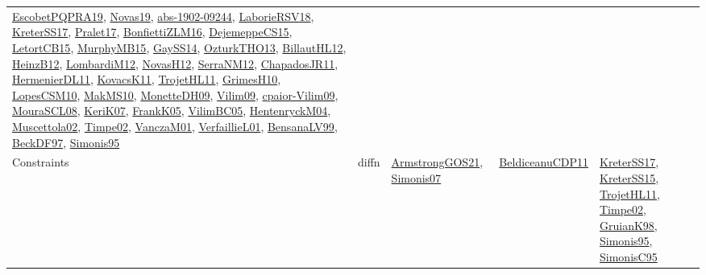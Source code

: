 {\begin{longtable}{lp{3cm}>{\raggedright}p{6cm}>{\raggedright}p{6cm}p{8cm}}
\href{articles/EscobetPQPRA19.pdf}{EscobetPQPRA19}\cite{EscobetPQPRA19}, \href{articles/Novas19.pdf}{Novas19}\cite{Novas19}, \href{articles/abs-1902-09244.pdf}{abs-1902-09244}\cite{abs-1902-09244}, \href{articles/LaborieRSV18.pdf}{LaborieRSV18}\cite{LaborieRSV18}, \href{articles/KreterSS17.pdf}{KreterSS17}\cite{KreterSS17}, \href{papers/Pralet17.pdf}{Pralet17}\cite{Pralet17}, \href{papers/BonfiettiZLM16.pdf}{BonfiettiZLM16}\cite{BonfiettiZLM16}, \href{papers/DejemeppeCS15.pdf}{DejemeppeCS15}\cite{DejemeppeCS15}, \href{articles/LetortCB15.pdf}{LetortCB15}\cite{LetortCB15}, \href{papers/MurphyMB15.pdf}{MurphyMB15}\cite{MurphyMB15}, \href{papers/GaySS14.pdf}{GaySS14}\cite{GaySS14}, \href{articles/OzturkTHO13.pdf}{OzturkTHO13}\cite{OzturkTHO13}, \href{papers/BillautHL12.pdf}{BillautHL12}\cite{BillautHL12}, \href{papers/HeinzB12.pdf}{HeinzB12}\cite{HeinzB12}, \href{articles/LombardiM12.pdf}{LombardiM12}\cite{LombardiM12}, \href{articles/NovasH12.pdf}{NovasH12}\cite{NovasH12}, \href{papers/SerraNM12.pdf}{SerraNM12}\cite{SerraNM12}, \href{papers/ChapadosJR11.pdf}{ChapadosJR11}\cite{ChapadosJR11}, \href{papers/HermenierDL11.pdf}{HermenierDL11}\cite{HermenierDL11}, \href{articles/KovacsK11.pdf}{KovacsK11}\cite{KovacsK11}, \href{articles/TrojetHL11.pdf}{TrojetHL11}\cite{TrojetHL11}, \href{papers/GrimesH10.pdf}{GrimesH10}\cite{GrimesH10}, \href{articles/LopesCSM10.pdf}{LopesCSM10}\cite{LopesCSM10}, \href{papers/MakMS10.pdf}{MakMS10}\cite{MakMS10}, \href{papers/MonetteDH09.pdf}{MonetteDH09}\cite{MonetteDH09}, \href{papers/Vilim09.pdf}{Vilim09}\cite{Vilim09}, \href{papers/cpaior-Vilim09.pdf}{cpaior-Vilim09}\cite{cpaior-Vilim09}, \href{papers/MouraSCL08.pdf}{MouraSCL08}\cite{MouraSCL08}, \href{papers/KeriK07.pdf}{KeriK07}\cite{KeriK07}, \href{papers/FrankK05.pdf}{FrankK05}\cite{FrankK05}, \href{articles/VilimBC05.pdf}{VilimBC05}\cite{VilimBC05}, \href{papers/HentenryckM04.pdf}{HentenryckM04}\cite{HentenryckM04}, \href{papers/Muscettola02.pdf}{Muscettola02}\cite{Muscettola02}, \href{articles/Timpe02.pdf}{Timpe02}\cite{Timpe02}, \href{papers/VanczaM01.pdf}{VanczaM01}\cite{VanczaM01}, \href{papers/VerfaillieL01.pdf}{VerfaillieL01}\cite{VerfaillieL01}, \href{articles/BensanaLV99.pdf}{BensanaLV99}\cite{BensanaLV99}, \href{papers/BeckDF97.pdf}{BeckDF97}\cite{BeckDF97}, \href{papers/Simonis95.pdf}{Simonis95}\cite{Simonis95}\\
Constraints & diffn & \href{papers/ArmstrongGOS21.pdf}{ArmstrongGOS21}\cite{ArmstrongGOS21}, \href{articles/Simonis07.pdf}{Simonis07}\cite{Simonis07} & \href{articles/BeldiceanuCDP11.pdf}{BeldiceanuCDP11}\cite{BeldiceanuCDP11} & \href{articles/KreterSS17.pdf}{KreterSS17}\cite{KreterSS17}, \href{papers/KreterSS15.pdf}{KreterSS15}\cite{KreterSS15}, \href{articles/TrojetHL11.pdf}{TrojetHL11}\cite{TrojetHL11}, \href{articles/Timpe02.pdf}{Timpe02}\cite{Timpe02}, \href{papers/GruianK98.pdf}{GruianK98}\cite{GruianK98}, \href{papers/Simonis95.pdf}{Simonis95}\cite{Simonis95}, \href{papers/SimonisC95.pdf}{SimonisC95}\cite{SimonisC95}\\

\end{longtable}}
